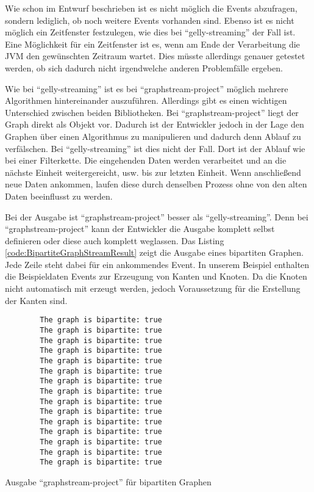 Wie schon im Entwurf beschrieben ist es nicht möglich die Events abzufragen,
sondern lediglich, ob noch weitere Events vorhanden sind. Ebenso ist es nicht
möglich ein Zeitfenster festzulegen, wie dies bei \enquote{gelly-streaming}
der Fall ist. Eine Möglichkeit für ein Zeitfenster ist es, wenn am Ende der
Verarbeitung die \gls{JVM} den gewünschten Zeitraum wartet. Dies müsste
allerdings genauer getestet werden, ob sich dadurch nicht irgendwelche anderen
Problemfälle ergeben.

Wie bei \enquote{gelly-streaming} ist es bei \enquote{graphstream-project}
möglich mehrere Algorithmen hintereinander auszuführen. Allerdings gibt es einen
wichtigen Unterschied zwischen beiden Bibliotheken. Bei \enquote{graphstream-project}
liegt der Graph direkt als Objekt vor. Dadurch ist der Entwickler jedoch in
der Lage den Graphen über einen Algorithmus zu manipulieren und dadurch denn
Ablauf zu verfälschen. Bei \enquote{gelly-streaming} ist dies nicht der Fall.
Dort ist der Ablauf wie bei einer Filterkette. Die eingehenden Daten werden
verarbeitet und an die nächste Einheit weitergereicht, usw. bis zur letzten
Einheit. Wenn anschließend neue Daten ankommen, laufen diese durch denselben
Prozess ohne von den alten Daten beeinflusst zu werden.

Bei der Ausgabe ist \enquote{graphstream-project} besser als
\enquote{gelly-streaming}. Denn bei \enquote{graphstream-project} kann der
Entwickler die Ausgabe komplett selbst definieren oder diese auch komplett
weglassen. Das Listing \ref{code:BipartiteGraphStreamResult} zeigt die Ausgabe
eines bipartiten Graphen. Jede Zeile steht dabei für ein ankommendes Event. In
unserem Beispiel enthalten die Beispieldaten Events zur Erzeugung von Kanten und
Knoten. Da die Knoten nicht automatisch mit erzeugt werden, jedoch Voraussetzung
für die Erstellung der Kanten sind.

\begin{listing}
    \begin{verbatim}
        The graph is bipartite: true
        The graph is bipartite: true
        The graph is bipartite: true
        The graph is bipartite: true
        The graph is bipartite: true
        The graph is bipartite: true
        The graph is bipartite: true
        The graph is bipartite: true
        The graph is bipartite: true
        The graph is bipartite: true
        The graph is bipartite: true
        The graph is bipartite: true
        The graph is bipartite: true
        The graph is bipartite: true
        The graph is bipartite: true
\end{verbatim}
\caption{Ausgabe \enquote{graphstream-project} für bipartiten Graphen}
\label{code:BipartiteGraphStreamResult}
\end{listing}

